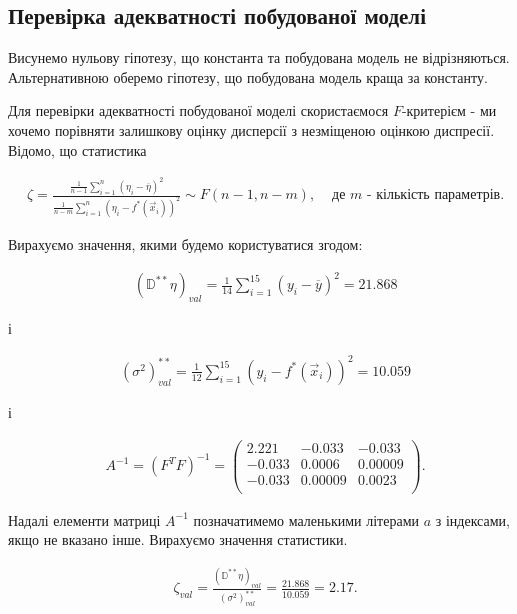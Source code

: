 \documentclass[14pt,a4paper]{scrartcl}
\theoremstyle{definition}
\theoremstyle{remark}
\theoremstyle{definition}
\theoremstyle{definition}
\begin{document}
\subsection{Перевірка адекватності побудованої моделі}

Висунемо нульову гіпотезу, що константа та побудована модель не відрізняються. Альтернативною оберемо гіпотезу, що побудована модель краща за константу.

Для перевірки адекватності побудованої моделі скористаємося $F$-критерієм - ми хочемо порівняти залишкову оцінку дисперсії з незміщеною оцінкою диспресії. Відомо, що статистика

\begin{align*}
  & \zeta = \frac{\frac{1}{n - 1} \sum_{i = 1}^{n} (\eta_{i} - \overline{\eta})^2}{\frac{1}{n - m} \sum_{i = 1}^{n} (\eta_{i} - f^{*}(\vec{x}_{i}))^2} \sim F(n - 1, n - m),  & \text{  де  } m \text{ - кількість параметрів.}
\end{align*}

Вирахуємо значення, якими будемо користуватися згодом:

\begin{align*}
   & (\mathbb{D}^{**}\eta)_{val} = \frac{1}{14} \sum_{i = 1}^{15} (y_{i} - \overline{y})^2 = 21.868
\end{align*}

і

\begin{align*}
   & (\sigma^2)^{**}_{val} = \frac{1}{12} \sum_{i = 1}^{15} (y_{i} - f^{*}(\vec{x}_{i}))^2 = 10.059
\end{align*}

і

\begin{align*}
  & A^{-1} = (F^{T}F)^{-1} = \begin{pmatrix}
    2.221 & -0.033 & -0.033 \\
    -0.033 & 0.0006 & 0.00009 \\
    -0.033 & 0.00009 & 0.0023 \\
  \end{pmatrix}.
\end{align*}

Надалі елементи матриці $A^{-1}$ позначатимемо маленькими літерами $a$ з індексами, якщо не вказано інше. Вирахуємо значення статистики.

\begin{align*}
  & \zeta_{val} = \frac{(\mathbb{D}^{**}\eta)_{val}}{(\sigma^2)^{**}_{val}} = \frac{21.868}{10.059} = 2.17.
\end{align*}
\end{document}
